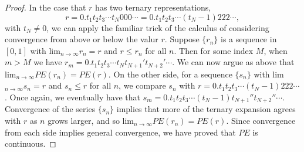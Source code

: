 \begin{proof}
In the case that $r$ has two ternary representations,
$$r = 0.t_1t_2t_3\cdots t_N000\cdots = 0.t_1t_2t_3\cdots (t_N - 1)222\cdots,$$
with $t_N \neq 0$, we can apply the familiar trick of the calculus of considering convergence from above or below the valur $r$. Suppose $\{ r_n \}$ is a sequence in $[0,1]$ with lim$_{n \rightarrow \infty}r_n = r$
and $r \leq r_n$ for all $n$. Then for some index $M$, when $m > M$ we have $r_m = 0.t_1t_2t_3\cdots t_Nt_{N+1}'t_{N+2}'\cdots$. We can now argue as above that lim$_{n \rightarrow \infty}PE(r_n) = PE(r).$
On the other side, for a sequence $\{ s_n \}$ with lim$_{n \rightarrow \infty}s_n = r$ and $s_n \leq r$ for all $n$, we compare $s_n$ with $r = 0.t_1t_2t_3\cdots(t_N-1)222\cdots$. Once again, we eventually have
that $s_m = 0.t_1t_2t_3\cdots(t_N-1)t_{N+1}''t_{N+2}''\cdots$. Convergence of the series $\{ s_n \}$ implies that more of the ternary expansion agrees with $r$ as $n$ grows larger, and so lim$_{n \rightarrow \infty}PE(r_n) = PE(r).$
Since convergence from each side implies general convergence, we have proved that $PE$ is continuous.
\end{proof}